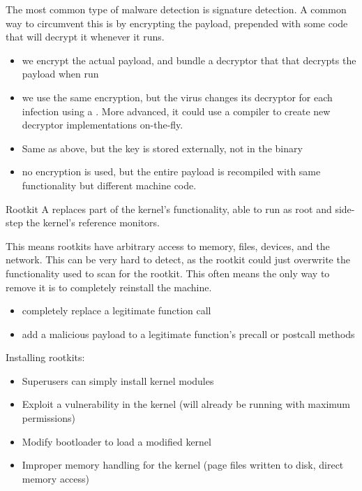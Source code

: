 \documentclass[code]{amznotes}
\begin{document}
The most common type of malware detection is signature detection. A common way to circumvent this is by encrypting the payload, prepended with some code that will decrypt it whenever it runs.
\begin{itemize}
    \item {} we encrypt the actual payload, and bundle a decryptor that that decrypts the payload when run
    \item {} we use the same encryption, but the virus changes its decryptor for each infection using a . More advanced, it could use a compiler to create new decryptor implementations on-the-fly.
    \item {} Same as above, but the key is stored externally, not in the binary
    \item {} no encryption is used, but the entire payload is recompiled with same functionality but different machine code.
\end{itemize}

\begin{dfnbox}{Rootkit}{}
    A  replaces part of the kernel's functionality, able to run as root and side-step the kernel's reference monitors.
\end{dfnbox}

This means rootkits have arbitrary access to memory, files, devices, and the network. This can be very hard to detect, as the rootkit could just overwrite the functionality used to scan for the rootkit. This often means the only way to remove it is to completely reinstall the machine.

\begin{itemize}
    \item {} completely replace a legitimate function call
    \item {} add a malicious payload to a legitimate function's precall or postcall methods
\end{itemize}

Installing rootkits:
\begin{itemize}
    \item Superusers can simply install kernel modules
    \item Exploit a vulnerability in the kernel (will already be running with maximum permissions)
    \item Modify bootloader to load a modified kernel
    \item Improper memory handling for the kernel  (page files written to disk, direct memory access)
\end{itemize}
\end{document}
